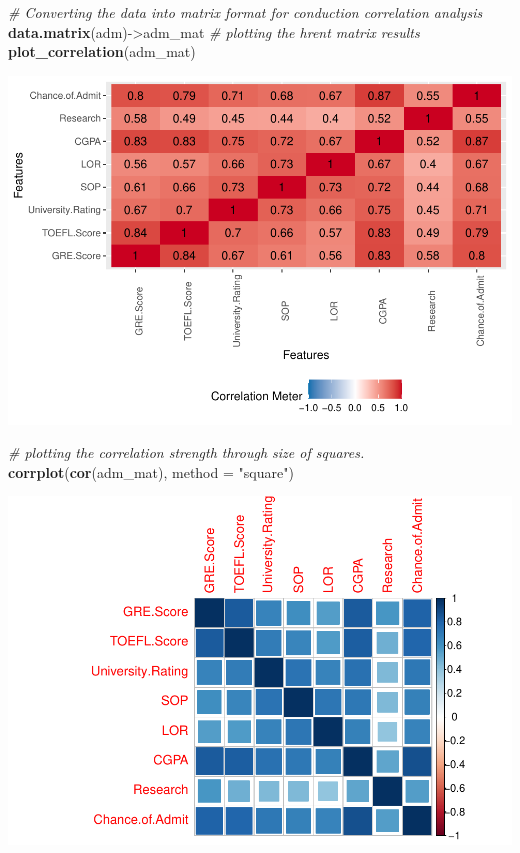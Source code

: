 \documentclass[11pt,]{article}
\newenvironment{Shaded}{\begin{snugshade}}{\end{snugshade}}
\newcommand{\CommentTok}[1]{\textcolor[rgb]{0.56,0.35,0.01}{\textit{#1}}}
\newcommand{\DataTypeTok}[1]{\textcolor[rgb]{0.13,0.29,0.53}{#1}}
\newcommand{\KeywordTok}[1]{\textcolor[rgb]{0.13,0.29,0.53}{\textbf{#1}}}
\newcommand{\NormalTok}[1]{#1}
\newcommand{\StringTok}[1]{\textcolor[rgb]{0.31,0.60,0.02}{#1}}
\begin{document}
\begin{Shaded}
\begin{Highlighting}[]
\CommentTok{# Converting the data into matrix format for conduction correlation analysis}
\KeywordTok{data.matrix}\NormalTok{(adm)->adm_mat }
\CommentTok{# plotting the hrent matrix results}
\KeywordTok{plot_correlation}\NormalTok{(adm_mat) }
\end{Highlighting}
\end{Shaded}

\includegraphics{USGradAdmission_files/figure-latex/unnamed-chunk-5-1.pdf}

\begin{Shaded}
\begin{Highlighting}[]
\CommentTok{# plotting the correlation strength through size of squares.}
\KeywordTok{corrplot}\NormalTok{(}\KeywordTok{cor}\NormalTok{(adm_mat), }\DataTypeTok{method =} \StringTok{"square"}\NormalTok{) }
\end{Highlighting}
\end{Shaded}

\includegraphics{USGradAdmission_files/figure-latex/unnamed-chunk-5-2.pdf}
\end{document}
